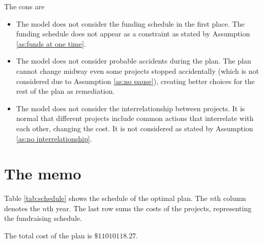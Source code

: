 \documentclass{article}
\begin{document}
The cons are
\begin{itemize}
\item The model does not consider the funding schedule in the first place.
The funding schedule does not appear as a constraint as stated by Assumption \ref{as:funds at one time}.
\item The model does not consider probable accidents during the plan.
The plan cannot change midway even some projects stopped accidentally (which is not considered due to Assumption \ref{as:no pause}), creating better choices for the rest of the plan as remediation.
\item The model does not consider the interrelationship between projects.
It is normal that different projects include common actions that interrelate with each other, changing the cost.
It is not considered as stated by Assumption \ref{as:no interrelationship}.
\end{itemize}

\newpage

\section{The memo}
\label{sec:memo}

Table \ref{tab:schedule} shows the schedule of the optimal plan.
The $n$th column denotes the $n$th year.
The last row sums the costs of the projects, representing the fundraising schedule.

The total cost of the plan is $\$11010118.27$.
\end{document}
